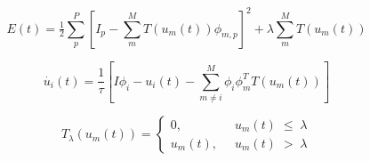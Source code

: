\documentclass[smallextended]{svjour3}       %
\newcommand{\argmin}{\operatornamewithlimits{argmin}}
\begin{document}
%

\begin{equation}
    E(t) = \tfrac{1}{2} \sum\limits_{p}^{P} \left[ I_{p} - \sum\limits_{m}^{M}T(u_{m}(t)) \phi_{m,p} \right]^{2} + \lambda \sum\limits_{m}^{M} T(u_{m}(t))
\label{indexenergyfunc}
\end{equation}

\begin{equation}
    \dot{u_{i}}(t) = \frac{1}{\tau} \left[ I\phi_{i} - u_{i}(t) - \sum_{m \neq i}^{M}\phi_{i}\phi_{m}^TT(u_{m}(t)) \right]
\label{lcaupdate}
\end{equation}

\begin{equation}
    T_{\lambda}(u_{m}(t)) = \left\{
    \begin{aligned}
        0,\;\; &u_{m}(t)\; \leq\; \lambda \\
        u_{m}(t),\;\; &u_{m}(t)\; >\; \lambda
    \end{aligned}
    \right.
\label{thresholdfunc}
\end{equation}


\end{document}

